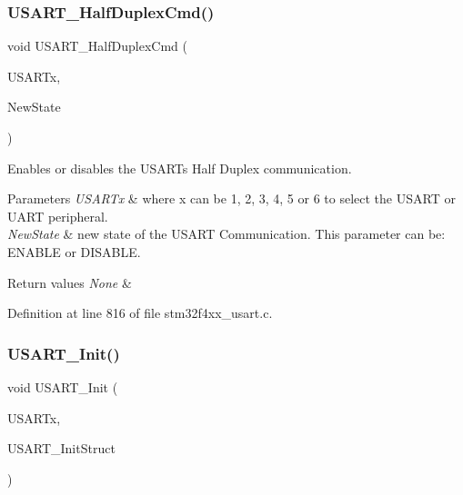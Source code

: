 \subsubsection{\texorpdfstring{U\+S\+A\+R\+T\+\_\+\+Half\+Duplex\+Cmd()}{USART\_HalfDuplexCmd()}}
{\footnotesize\ttfamily void U\+S\+A\+R\+T\+\_\+\+Half\+Duplex\+Cmd (\begin{DoxyParamCaption}\item[{\hyperlink{struct_u_s_a_r_t___type_def}{U\+S\+A\+R\+T\+\_\+\+Type\+Def} $\ast$}]{U\+S\+A\+R\+Tx,  }\item[{Functional\+State}]{New\+State }\end{DoxyParamCaption})}



Enables or disables the U\+S\+A\+RT\textquotesingle{}s Half Duplex communication. 


\begin{DoxyParams}{Parameters}
{\em U\+S\+A\+R\+Tx} & where x can be 1, 2, 3, 4, 5 or 6 to select the U\+S\+A\+RT or U\+A\+RT peripheral. \\
\hline
{\em New\+State} & new state of the U\+S\+A\+RT Communication. This parameter can be\+: E\+N\+A\+B\+LE or D\+I\+S\+A\+B\+LE. \\
\hline
\end{DoxyParams}

\begin{DoxyRetVals}{Return values}
{\em None} & \\
\hline
\end{DoxyRetVals}


Definition at line 816 of file stm32f4xx\+\_\+usart.\+c.

\mbox{\label{group___u_s_a_r_t_ga98da340ea0324002ba1b4263e91ab2ff}} 
\subsubsection{\texorpdfstring{U\+S\+A\+R\+T\+\_\+\+Init()}{USART\_Init()}}
{\footnotesize\ttfamily void U\+S\+A\+R\+T\+\_\+\+Init (\begin{DoxyParamCaption}\item[{\hyperlink{struct_u_s_a_r_t___type_def}{U\+S\+A\+R\+T\+\_\+\+Type\+Def} $\ast$}]{U\+S\+A\+R\+Tx,  }\item[{\hyperlink{struct_u_s_a_r_t___init_type_def}{U\+S\+A\+R\+T\+\_\+\+Init\+Type\+Def} $\ast$}]{U\+S\+A\+R\+T\+\_\+\+Init\+Struct }\end{DoxyParamCaption})}



